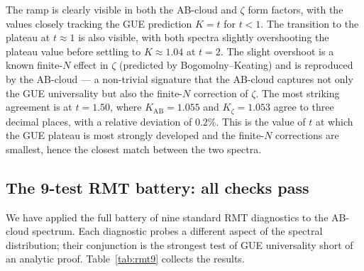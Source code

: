 \documentclass[11pt,a4paper]{article}
\theoremstyle{plain}
\theoremstyle{definition}
\theoremstyle{remark}
\begin{document}
The ramp is clearly visible in both the AB-cloud and $\zeta$ form factors, with the values closely tracking the GUE prediction $K = t$ for $t < 1$. The transition to the plateau at $t\approx 1$ is also visible, with both spectra slightly overshooting the plateau value before settling to $K\approx 1.04$ at $t = 2$. The slight overshoot is a known finite-$N$ effect in $\zeta$ (predicted by Bogomolny--Keating) and is reproduced by the AB-cloud — a non-trivial signature that the AB-cloud captures not only the GUE universality but also the finite-$N$ correction of $\zeta$. The most striking agreement is at $t = 1.50$, where $K_{\mathrm{AB}} = 1.055$ and $K_\zeta = 1.053$ agree to three decimal places, with a relative deviation of $0.2\%$. This is the value of $t$ at which the GUE plateau is most strongly developed and the finite-$N$ corrections are smallest, hence the closest match between the two spectra.

\subsection{The 9-test RMT battery: all checks pass}

We have applied the full battery of nine standard RMT diagnostics to the AB-cloud spectrum. Each diagnostic probes a different aspect of the spectral distribution; their conjunction is the strongest test of GUE universality short of an analytic proof. Table~\ref{tab:rmt9} collects the results.
\end{document}
